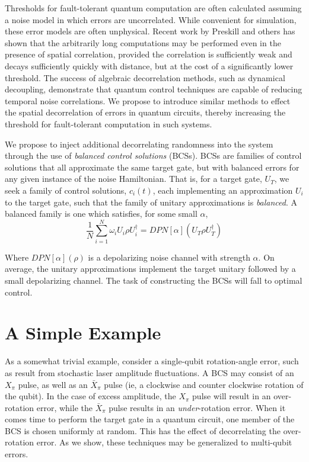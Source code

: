 \documentclass[aps,nofootinbib,pra,notitlepage,twocolumn]{revtex4-1}
\begin{document}
Thresholds for fault-tolerant quantum computation are often calculated assuming a noise model in which errors are uncorrelated. While convenient for simulation, these error models are often unphysical.  Recent work by Preskill and others has shown that the arbitrarily long computations may be performed even in the presence of spatial correlation, provided the correlation is sufficiently weak and decays sufficiently quickly with distance, but at the cost of a significantly lower threshold. The success of algebraic decorrelation methods, such as dynamical decoupling, demonstrate that quantum control techniques are capable of reducing temporal noise correlations. We propose to introduce similar methods to effect the spatial decorrelation of errors in quantum circuits, thereby increasing the threshold for fault-tolerant computation in such systems.

We propose to inject additional decorrelating randomness into the system through the use of \emph{balanced control solutions} (BCSs).  BCSs are families of control solutions that all approximate the same target gate, but with balanced errors for any given instance of the noise Hamiltonian.  That is, for a target gate, $U_T$, we seek a family of control solutions, $c_i(t)$, each implementing an approximation $U_i$ to the target gate, such that the family of unitary approximations is \emph{balanced}.  A balanced family is one which satisfies, for some small $\alpha$,
\begin{equation}\label{eq:1}
    \frac{1}{N}\sum_{i=1}^N \omega_i U_i \rho U_i^\dagger = DPN[\alpha]\left(U_T \rho U_T^\dagger \right)
\end{equation}

Where $DPN[\alpha](\rho)$ is a depolarizing noise channel with strength $\alpha$. On average, the unitary approximations implement the target unitary followed by a small depolarizing channel. The task of constructing the BCSs will fall to optimal control.



\section{A Simple Example}
As a somewhat trivial example, consider a single-qubit rotation-angle error, such as result from stochastic laser amplitude fluctuations. A BCS may consist of an $X_\pi$ pulse, as well as an $\bar X_\pi$ pulse (ie, a clockwise and counter clockwise rotation of the qubit).  In the case of excess amplitude, the $X_\pi$ pulse will result in an over-rotation error, while the $\bar X_\pi$ pulse results in an \emph{under}-rotation error.  When it comes time to perform the target gate in a quantum circuit, one member of the BCS is chosen uniformly at random.  This has the effect of decorrelating the over-rotation error.  As we show, these techniques may be generalized to multi-qubit errors.
\end{document}

